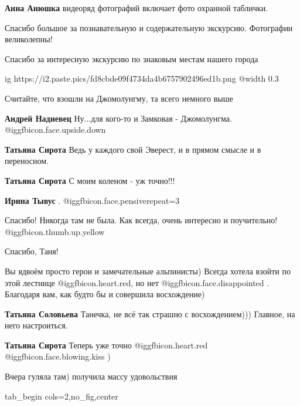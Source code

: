 \begin{itemize}
\begin{itemize}
\begin{itemize}
\textbf{Анна Анюшка} видеоряд фотографий включает фото охранной таблички.
\end{itemize} %

\end{itemize} %

Спасибо большое за познавательную и содержательную экскурсию. Фотографии великолепны!

Спасибо за интересную экскурсию по знаковым местам нашего города

\ifcmt
  ig https://i2.paste.pics/fd8cbde09f4734da4b6757902496ed1b.png
  @width 0.3
\fi

Считайте, что взошли на Джомолунгму, та всего немного выше

\begin{itemize} %
\textbf{Андрей Надиевец} Ну...для кого-то и Замковая - Джомолунгма. @igg{fbicon.face.upside.down} 

\textbf{Татьяна Сирота} Ведь у каждого свой Эверест, и в прямом смысле и в переносном.

\textbf{Татьяна Сирота} С моим коленом - уж точно!!!

\textbf{Ирина Тывус} . @igg{fbicon.face.pensive}{repeat=3} 
\end{itemize} %

Спасибо! Никогда там не была. Как всегда, очень интересно и поучительно!
@igg{fbicon.thumb.up.yellow} 

Спасибо, Таня!


Вы вдвоём просто герои и замечательные альпинисты) Всегда хотела взойти по этой
лестнице @igg{fbicon.heart.red}, но нет  @igg{fbicon.face.disappointed} .
Благодаря вам, как будто бы и совершила восхождение)

\begin{itemize} %
\textbf{Татьяна Соловьева} Танечка, не всё так страшно с восхождением)))
Главное, на него настроиться.

\textbf{Татьяна Сирота} Теперь уже точно @igg{fbicon.heart.red} @igg{fbicon.face.blowing.kiss} )
\end{itemize} %

Вчера гуляла там) получила массу удовольствия

\ifcmt
tab_begin cols=2,no_fig,center


\end{itemize}
